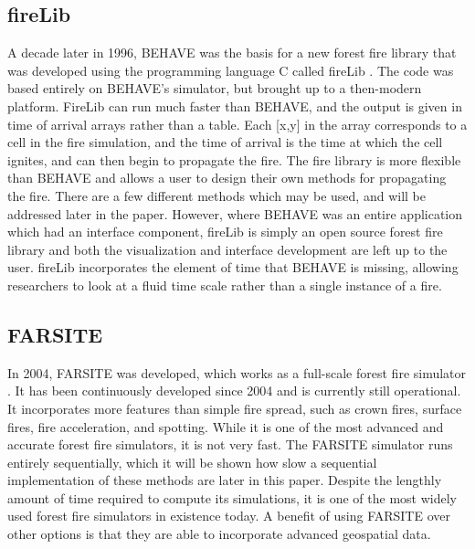 \subsection{fireLib}
A decade later in 1996, BEHAVE was the basis for a new forest fire library that was developed using the programming language C called fireLib \cite{fireLib}. The code was based entirely on BEHAVE's simulator, but brought up to a then-modern platform. FireLib can run much faster than BEHAVE, and the output is given in time of arrival arrays rather than a table. Each [x,y] in the array corresponds to a cell in the fire simulation, and the time of arrival is the time at which the cell ignites, and can then begin to propagate the fire. The fire library is more flexible than BEHAVE and allows a user to design their own methods for propagating the fire. There are a few different methods which may be used, and will be addressed later in the paper. However, where BEHAVE was an entire application which had an interface component, fireLib is simply an open source forest fire library and both the visualization and interface development are left up to the user. fireLib incorporates the element of time that BEHAVE is missing, allowing researchers to look at a fluid time scale rather than a single instance of a fire. 

\subsection{FARSITE}
In 2004, FARSITE was developed, which works as a full-scale forest fire simulator \cite{FARSITE}. It has been continuously developed since 2004 and is currently still operational. It incorporates more features than simple fire spread, such as crown fires, surface fires, fire acceleration, and spotting. While it is one of the most advanced and accurate forest fire simulators, it is not very fast. The FARSITE simulator runs entirely sequentially, which it will be shown how slow a sequential implementation of these methods are later in this paper. Despite the lengthly amount of time required to compute its simulations, it is one of the most widely used forest fire simulators in existence today. A benefit of using FARSITE over other options is that they are able to incorporate advanced geospatial data.

